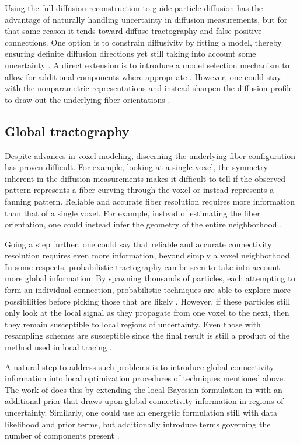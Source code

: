 \documentclass[final,hyperref]{gatech-thesis}
\begin{document}
Using the full diffusion reconstruction to guide particle diffusion has the
advantage of naturally handling uncertainty in diffusion measurements, but for
that same reason it tends toward diffuse tractography and false-positive
connections.  One option is to constrain diffusivity by fitting a model,
thereby ensuring definite diffusion directions yet still taking into account
some uncertainty \cite{Parker2005,Friman2006,Behrens2003}.  A direct extension
is to introduce a model selection mechanism to allow for additional components
where appropriate \cite{Behrens2007,Freidlin2007}.
%
However, one could stay with the nonparametric representations and instead
sharpen the diffusion profile to draw out the underlying fiber orientations
\cite{Tournier2007,Descoteaux2009tmi}.




\subsection{Global tractography}

Despite advances in voxel modeling, discerning the underlying fiber
configuration has proven difficult.  For example, looking at a single voxel,
the symmetry inherent in the diffusion measurements makes it difficult to tell
if the observed pattern represents a fiber curving through the voxel or
instead represents a fanning pattern.
%
Reliable and accurate fiber resolution requires more information than that of
a single voxel.
%
For example, instead of estimating the fiber orientation, one could instead
infer the geometry of the entire neighborhood \cite{Savadjiev2008}.

Going a step further, one could say that reliable and accurate connectivity
resolution requires even more information, beyond simply a voxel neighborhood.
%
In some respects, probabilistic tractography can be seen to take into account
more global information.  By spawning thousands of particles, each attempting
to form an individual connection, probabilistic techniques are able to explore
more possibilities before picking those that are likely \cite{Parker2003}.
However, if these particles still only look at the local signal as they
propagate from one voxel to the next, then they remain susceptible to local
regions of uncertainty.  Even those with resampling schemes are susceptible
since the final result is still a product of the method used in local tracing
\cite{Bjornemo2002,Zhang2009}.

A natural step to address such problems is to introduce global connectivity
information into local optimization procedures of techniques mentioned above.
%
The work of \cite{Jbabdi2007} does this by extending the local Bayesian
formulation in \cite{Behrens2007} with an additional prior that draws upon
global connectivity information in regions of uncertainty.
%
Similarly, one could use an energetic formulation still with data likelihood
and prior terms, but additionally introduce terms governing the number of
components present \cite{Fillard2009}.
\end{document}
